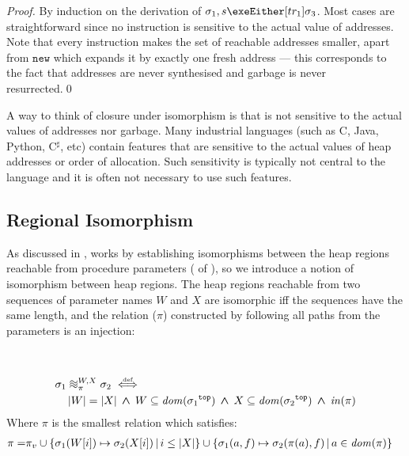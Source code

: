 \documentclass[runningheads,a4paper]{llncs}
\DeclareMathOperator{\band}{\bm{\;\land\;}}
\newcommand*{\domain}[1]{\mathit{dom}(#1)}
\newcommand*{\cardinality}[1]{\left|{#1}\right|}
\newcommand*{\defiff}{\stackrel{\text{\tiny def}}{\iff}}
\newcommand*{\setcomp}[2]{\left\{#1\,\middle|\,#2\right\}}
\newcommand*{\news}{\texttt{new}}
\newcommand{\tr}{tr}
\newcommand*{\bijection}[1]{\mathit{in}{\left(#1\right)}}
\newcommand*{\wiso}{%
  \mathrel{\vcenter{\offinterlineskip
  \hbox{$\sim$}\vskip-.35ex\hbox{$\sim$}\vskip-.35ex\hbox{$\sim$}}}}
\newcommand*{\store}{\sigma}
\newcommand*{\topof}[1]{{#1}^{\mathtt{top}}}
\newcommand{\ncui}{closure under isomorphism}
\begin{document}
\begin{proof}By induction on the derivation of $\store_1,s\exeEither[\tr_1]\store_3$. Most cases are straightforward since no instruction is sensitive to the actual value of addresses. Note that every instruction makes the set of reachable addresses smaller, apart from $\news$ which expands it by exactly one fresh address --- this corresponds to the fact that addresses are never synthesised and garbage is never resurrected.\qed\end{proof}

A way to think of \ncui{} is that \lang{} is not sensitive to the actual values of addresses nor garbage. Many industrial languages (such as C, Java, Python, C$^\sharp$, etc) contain features that are sensitive to the actual values of heap addresses or order of allocation. Such sensitivity is typically not central to the language and it is often not necessary to use such features.

\subsection{Regional Isomorphism}

As discussed in , \Tool{} works by establishing isomorphisms between the heap regions reachable from procedure parameters ( of ), so we introduce a notion of isomorphism between heap regions. The heap regions reachable from two sequences of parameter names $W$ and $X$ are isomorphic iff the sequences have the same length, and the relation ($\pi$) constructed by following all paths from the parameters is an injection:

\begin{definition}\label{def:regional isomorphism}\setlength{\parindent}{0cm}~

\[\begin{aligned}
&	\store_1\wiso_{\pi}^{W,X}\store_2 \defiff \\
&\quad	\cardinality{W} = \cardinality{X} \band W \subseteq \domain{\topof{\store_1}} \band X \subseteq \domain{\topof{\store_2}} \band \bijection{\pi}
\end{aligned}\]
	Where $\pi$ is the smallest relation which satisfies:
		\[\begin{aligned}
		   \pi = &\piv \cup
		   \setcomp{\store_1(W[i])\mapsto\store_2(X[i])}{i \le \cardinality{X}} \cup
		   \setcomp{\store_1(a,f)\mapsto\store_2(\pi(a),f)}{a \in \domain{\pi}}
		\end{aligned}\]
\end{definition}
\end{document}
